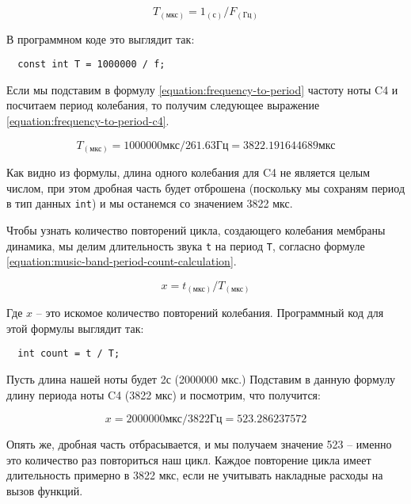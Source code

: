 \documentclass[../sparc.tex]{subfiles}
\begin{document}
\begin{equation}
  T_{(\mbox{мкс})} = 1_{(с)} / F_{(\mbox{Гц})}
  \label{equation:frequency-to-period}
\end{equation}

В программном коде это выглядит так:

\begin{verbatim}
  const int T = 1000000 / f;
\end{verbatim}

Если мы подставим в формулу \ref{equation:frequency-to-period} частоту ноты C4 и
посчитаем период колебания, то получим следующее выражение
\ref{equation:frequency-to-period-c4}.

\begin{equation}
  T_{(\mbox{мкс})} = 1000000 \mbox{мкс} / 261.63 \mbox{Гц} = 3822.191644689 \mbox{мкс}
  \label{equation:frequency-to-period-c4}
\end{equation}

Как видно из формулы, длина одного колебания для C4 не является целым числом,
при этом дробная часть будет отброшена (поскольку мы сохраням период в тип
данных \texttt{int}) и мы останемся со значением 3822 мкс.

Чтобы узнать количество повторений цикла, создающего колебания мембраны
динамика, мы делим длительность звука \texttt{t} на период \texttt{T}, согласно
формуле \ref{equation:music-band-period-count-calculation}.

\begin{equation}
  x = t_{(\mbox{мкс})} / T_{(\mbox{мкс})}
  \label{equation:music-band-period-count-calculation}
\end{equation}

Где $x$ -- это искомое количество повторений колебания.  Программный код для этой
формулы выглядит так:

\begin{verbatim}
  int count = t / T;
\end{verbatim}

Пусть длина нашей ноты будет 2с (2000000 мкс.)  Подставим в данную формулу длину
периода ноты C4 (3822 мкс) и посмотрим, что получится:

\begin{equation}
  x = 2000000 \mbox{мкс} / 3822 \mbox{Гц} = 523.286237572
\end{equation}

Опять же, дробная часть отбрасывается, и мы получаем значение 523 -- именно это
количество раз повториться наш цикл.  Каждое повторение цикла имеет длительность
примерно в 3822 мкс, если не учитывать накладные расходы на вызов функций.
\end{document}

